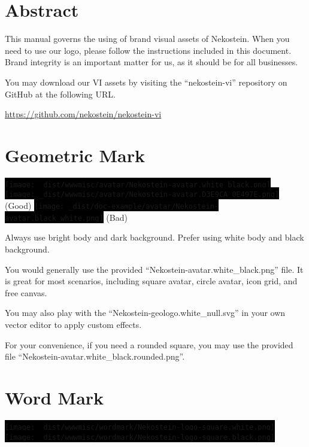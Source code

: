 \documentclass[a4paper,11pt]{report}
\newcommand{\altfbox}[1]{%
    \colorbox{black}{#1}%
}
\begin{document}
\sffamily

\tableofcontents\clearpage




\chapter{Abstract}
This manual governs the using of brand visual assets of Nekostein.
When you need to use our logo, please follow the instructions included in this document.
Brand integrity is an important matter for us, as it should be for all businesses.

You may download our VI assets by visiting the ``nekostein-vi'' repository on GitHub at the following URL.

\begin{center}
    \href{https://github.com/nekostein/nekostein-vi}{https://github.com/nekostein/nekostein-vi}
\end{center}






\chapter{Geometric Mark}
\altfbox{\texttt{[image: \_dist/wwwmisc/avatar/Nekostein-avatar.white\_black.png]}}~~%
\altfbox{\texttt{[image: \_dist/wwwmisc/avatar/Nekostein-avatar.D3E9CA\_0E497E.png]}} (Good)
\hfill
\altfbox{\texttt{[image: \_dist/doc-example/avatar/Nekostein-avatar.black\_white.png]}} (Bad)

Always use bright body and dark background. Prefer using white body and black background.

You would generally use the provided ``Nekostein-avatar.white\_black.png'' file.
It is great for most scenarios, including square avatar, circle avatar, icon grid, and free canvas.

You may also play with the ``Nekostein-geologo.white\_null.svg'' in your own vector editor to apply custom effects.

For your convenience, if you need a rounded square, you may use the provided file ``Nekostein-avatar.white\_black.rounded.png''.





\chapter{Word Mark}
\altfbox{\texttt{[image: \_dist/wwwmisc/wordmark/Nekostein-logo-square.white.png]}}~~%
\altfbox{\texttt{[image: \_dist/wwwmisc/wordmark/Nekostein-logo-square.black.png]}}
\end{document}
